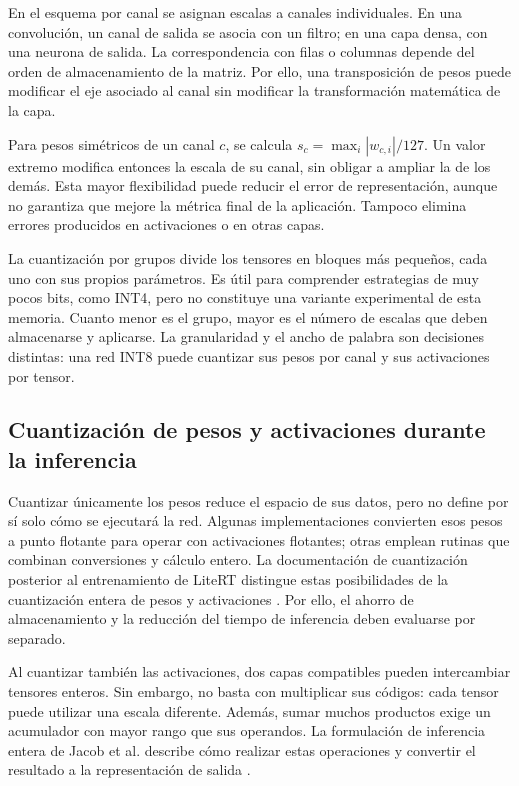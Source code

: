 En el esquema por canal se asignan escalas a canales individuales. En una convolución, un canal de salida se asocia con un filtro; en una capa densa, con una neurona de salida. La correspondencia con filas o columnas depende del orden de almacenamiento de la matriz. Por ello, una transposición de pesos puede modificar el eje asociado al canal sin modificar la transformación matemática de la capa.

Para pesos simétricos de un canal $c$, se calcula $s_c=\max_i|w_{c,i}|/127$. Un valor extremo modifica entonces la escala de su canal, sin obligar a ampliar la de los demás. Esta mayor flexibilidad puede reducir el error de representación, aunque no garantiza que mejore la métrica final de la aplicación. Tampoco elimina errores producidos en activaciones o en otras capas.

La cuantización por grupos divide los tensores en bloques más pequeños, cada uno con sus propios parámetros. Es útil para comprender estrategias de muy pocos bits, como INT4, pero no constituye una variante experimental de esta memoria. Cuanto menor es el grupo, mayor es el número de escalas que deben almacenarse y aplicarse. La granularidad y el ancho de palabra son decisiones distintas: una red INT8 puede cuantizar sus pesos por canal y sus activaciones por tensor.

\subsection{Cuantización de pesos y activaciones durante la inferencia}
Cuantizar únicamente los pesos reduce el espacio de sus datos, pero no define por sí solo cómo se ejecutará la red. Algunas implementaciones convierten esos pesos a punto flotante para operar con activaciones flotantes; otras emplean rutinas que combinan conversiones y cálculo entero. La documentación de cuantización posterior al entrenamiento de LiteRT distingue estas posibilidades de la cuantización entera de pesos y activaciones \cite{litertptq}. Por ello, el ahorro de almacenamiento y la reducción del tiempo de inferencia deben evaluarse por separado.

Al cuantizar también las activaciones, dos capas compatibles pueden intercambiar tensores enteros. Sin embargo, no basta con multiplicar sus códigos: cada tensor puede utilizar una escala diferente. Además, sumar muchos productos exige un acumulador con mayor rango que sus operandos. La formulación de inferencia entera de Jacob et al. describe cómo realizar estas operaciones y convertir el resultado a la representación de salida \cite{jacob2018}.

